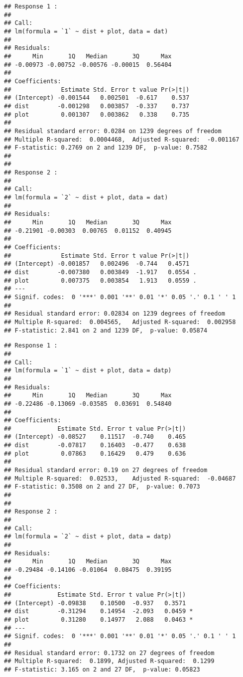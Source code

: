 \documentclass[]{article}
\begin{document}
\begin{verbatim}
## Response 1 :
## 
## Call:
## lm(formula = `1` ~ dist + plot, data = dat)
## 
## Residuals:
##      Min       1Q   Median       3Q      Max 
## -0.00973 -0.00752 -0.00576 -0.00015  0.56404 
## 
## Coefficients:
##              Estimate Std. Error t value Pr(>|t|)
## (Intercept) -0.001544   0.002501  -0.617    0.537
## dist        -0.001298   0.003857  -0.337    0.737
## plot         0.001307   0.003862   0.338    0.735
## 
## Residual standard error: 0.0284 on 1239 degrees of freedom
## Multiple R-squared:  0.0004468,  Adjusted R-squared:  -0.001167 
## F-statistic: 0.2769 on 2 and 1239 DF,  p-value: 0.7582
## 
## 
## Response 2 :
## 
## Call:
## lm(formula = `2` ~ dist + plot, data = dat)
## 
## Residuals:
##      Min       1Q   Median       3Q      Max 
## -0.21901 -0.00303  0.00765  0.01152  0.40945 
## 
## Coefficients:
##              Estimate Std. Error t value Pr(>|t|)  
## (Intercept) -0.001857   0.002496  -0.744   0.4571  
## dist        -0.007380   0.003849  -1.917   0.0554 .
## plot         0.007375   0.003854   1.913   0.0559 .
## ---
## Signif. codes:  0 '***' 0.001 '**' 0.01 '*' 0.05 '.' 0.1 ' ' 1
## 
## Residual standard error: 0.02834 on 1239 degrees of freedom
## Multiple R-squared:  0.004565,   Adjusted R-squared:  0.002958 
## F-statistic: 2.841 on 2 and 1239 DF,  p-value: 0.05874
\end{verbatim}

\begin{verbatim}
## Response 1 :
## 
## Call:
## lm(formula = `1` ~ dist + plot, data = datp)
## 
## Residuals:
##      Min       1Q   Median       3Q      Max 
## -0.22486 -0.13069 -0.03585  0.03691  0.54840 
## 
## Coefficients:
##             Estimate Std. Error t value Pr(>|t|)
## (Intercept) -0.08527    0.11517  -0.740    0.465
## dist        -0.07817    0.16403  -0.477    0.638
## plot         0.07863    0.16429   0.479    0.636
## 
## Residual standard error: 0.19 on 27 degrees of freedom
## Multiple R-squared:  0.02533,    Adjusted R-squared:  -0.04687 
## F-statistic: 0.3508 on 2 and 27 DF,  p-value: 0.7073
## 
## 
## Response 2 :
## 
## Call:
## lm(formula = `2` ~ dist + plot, data = datp)
## 
## Residuals:
##      Min       1Q   Median       3Q      Max 
## -0.29484 -0.14106 -0.01064  0.08475  0.39195 
## 
## Coefficients:
##             Estimate Std. Error t value Pr(>|t|)  
## (Intercept) -0.09838    0.10500  -0.937   0.3571  
## dist        -0.31294    0.14954  -2.093   0.0459 *
## plot         0.31280    0.14977   2.088   0.0463 *
## ---
## Signif. codes:  0 '***' 0.001 '**' 0.01 '*' 0.05 '.' 0.1 ' ' 1
## 
## Residual standard error: 0.1732 on 27 degrees of freedom
## Multiple R-squared:  0.1899, Adjusted R-squared:  0.1299 
## F-statistic: 3.165 on 2 and 27 DF,  p-value: 0.05823
\end{verbatim}
\end{document}
